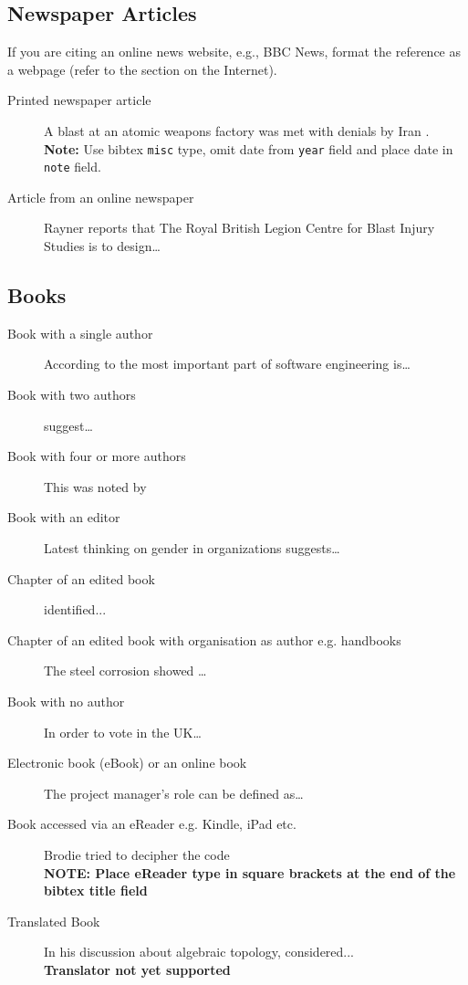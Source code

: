 \subsection{Newspaper Articles}
\label{Sec:Newspapers}
If you are citing an online news website, e.g., BBC News, format the reference as a webpage (refer
to the section on the Internet).

\begin{description}
\item[Printed newspaper article] A blast at an atomic weapons factory was
met with denials by Iran \cite{frenkel_europe_nodate}.\\
\textbf{Note:} Use bibtex \texttt{misc} type, omit date from \texttt{year} field and place date in \texttt{note} field. 
\item[Article from an online newspaper]  Rayner \cite{rayner_combat_2011} reports that The Royal British Legion Centre for Blast Injury Studies is
to design…
\end{description}

\subsection{Books}
\label{sec:NumberedBooks}
\begin{description}
\item[Book with a single author] According to \textcite[p.35]{sommerville_software_2007} the most important part of software engineering is…
\item[Book with two authors] \textcite[p.65]{stair_principles_2010} suggest…
\item[Book with four or more authors] This was noted by \textcite[p.15]{payne_relationship_1995}
\item[Book with an editor] Latest thinking on gender in organizations
suggests… \cite{kumra_oxford_2014}
\item[Chapter of an edited book] \textcite[p.35]{haase_standards_2005} identified...
\item[Chapter of an edited book with organisation as author e.g. handbooks] 
The steel corrosion showed …\parencite{asm_international_corrosion_1998}
\item[Book with no author] In order to vote in the UK…\parencite{noauthor_whitakers_2011}
\item[Electronic book (eBook) or an online book] The project manager’s role can be defined as… \parencite{kerzer_project_2009}
\item[Book accessed via an eReader e.g. Kindle, iPad etc.]
Brodie tried to decipher the \linebreak code~\cite{dennis_secret_2012}\\
\textbf{NOTE: Place eReader type in square brackets at the end of the bibtex title field}
\item[Translated Book] In his discussion about algebraic
topology, \textcite[p.17]{matvev_lectures_2006} considered...\\
\textbf{Translator not yet supported}
\end{description}




